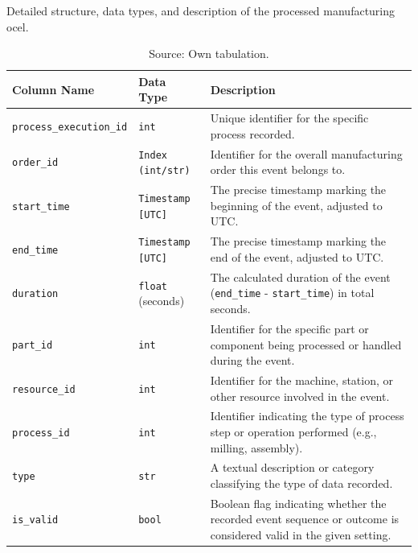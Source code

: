 \begin{table}[htbp]
  \centering
  \caption[Illustrative Manufacturing OCEL]{Detailed structure, data types, and description of the processed manufacturing \gls{ocel}.}
  \label{tab:output-structure-detailed}
  \begin{tabular}{l l p{6cm}} %
    \toprule
    \textbf{Column Name}            & \textbf{Data Type}       & \textbf{Description}                                                                                             \\
    \midrule
    \texttt{process\_execution\_id} & \texttt{int}             & Unique identifier for the specific process recorded.                                                             \\
    \texttt{order\_id}              & \texttt{Index (int/str)} & Identifier for the overall manufacturing order this event belongs to.                                            \\
    \texttt{start\_time}            & \texttt{Timestamp [UTC]} & The precise timestamp marking the beginning of the event, adjusted to UTC.                                       \\
    \texttt{end\_time}              & \texttt{Timestamp [UTC]} & The precise timestamp marking the end of the event, adjusted to UTC.                                             \\
    \texttt{duration}               & \texttt{float} (seconds) & The calculated duration of the event (\texttt{end\_time} - \texttt{start\_time}) in total seconds.               \\
    \texttt{part\_id}               & \texttt{int}             & Identifier for the specific part or component being processed or handled during the event.                       \\
    \texttt{resource\_id}           & \texttt{int}             & Identifier for the machine, station, or other resource involved in the event.                                    \\
    \texttt{process\_id}            & \texttt{int}             & Identifier indicating the type of process step or operation performed (e.g., milling, assembly).                 \\
    \texttt{type}                   & \texttt{str}             & A textual description or category classifying the type of data recorded.                                         \\
    \texttt{is\_valid}              & \texttt{bool}            & Boolean flag indicating whether the recorded event sequence or outcome is considered valid in the given setting. \\
    \bottomrule
  \end{tabular}
  \caption*{Source: Own tabulation.}
\end{table}

